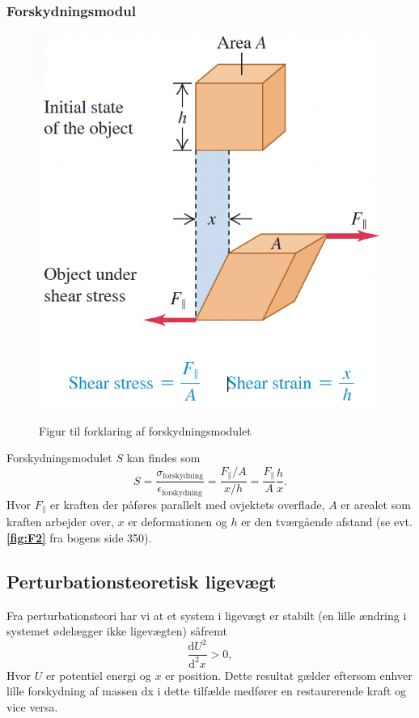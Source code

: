\subsubsection{Forskydningsmodul} \label{afs:formod}
\begin{figure} [ht]
  \centering
  \caption{Figur til forklaring af forskydningsmodulet}
  \includegraphics[width=0.2\linewidth]{../figures/F2.png}
  \label{fig:F2}
\end{figure}

Forskydningsmodulet $S$ kan findes som
\[ 
S = \frac{\sigma_{\text{forskydning}}}{\epsilon_{\text{forskydning}}} = \frac{F_{\parallel} / A}{x / h} = \frac{F_{\parallel}}{A} \frac{h}{x}
.\]
Hvor $F_{\parallel}$ er kraften der påføres parallelt med ovjektets overflade, $A$ er arealet som kraften arbejder over, $x$ er deformationen og $h$ er den tværgående afstand (se evt. \textbf{\autoref{fig:F2}} fra bogens side 350).


\subsection{Perturbationsteoretisk ligevægt}
Fra perturbationsteori har vi at et system i ligevægt er stabilt (en lille ændring i systemet ødelægger ikke ligevægten) såfremt
\[ 
\frac{\mathrm{d}U^2}{\mathrm{d}^2x} > 0
,\]
Hvor $U$ er potentiel energi og $x$ er position. Dette resultat gælder eftersom enhver lille forskydning af massen dx i dette tilfælde medfører en restaurerende kraft og vice versa.

